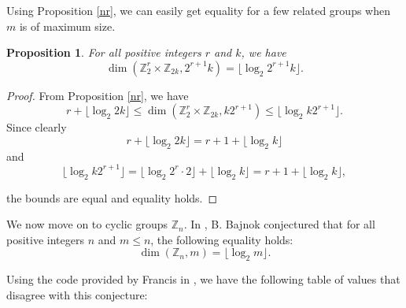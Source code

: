 \documentclass[11pt]{article}
\newcommand{\Z}{\mathbb{Z}}
\newtheorem{prop}[thm]{Proposition}
\begin{document}
\newpage
Using Proposition \ref{nr}, we can easily get equality for a few related groups when $m$ is of maximum size.



\begin{prop}
For all positive integers $r$ and $k$, we have
\[\dim(\Z_2^r\times\Z_{2k},2^{r+1}k)=\lfloor\log_2 2^{r+1}k\rfloor.\]
\end{prop}
\begin{proof}
    From Proposition \ref{nr}, we have
    \[r+\lfloor\log_2 2k\rfloor\leq\dim(\Z_2^r\times\Z_{2k},k2^{r+1})\leq\lfloor\log_2 k2^{r+1}\rfloor.\]
    Since clearly
    \[r+\lfloor\log_2 2k\rfloor=r+1+\lfloor\log_2 k\rfloor\]
    and
    \[\lfloor\log_2 k2^{r+1}\rfloor=\lfloor\log_2 2^r\cdot 2\rfloor+\lfloor\log_2 k\rfloor=r+1+\lfloor\log_2 k\rfloor,\]
    
    \noindent the bounds are equal and equality holds.
\end{proof}


We now move on to cyclic groups $\Z_n$. In \cite{bb}, B. Bajnok conjectured that for all positive integers $n$ and $m\leq n$, the following equality holds:
\[\dim(\Z_n,m)=\lfloor \log_2 m\rfloor.\]

Using the code provided by Francis in \cite{peter}, we have the following table of values that disagree with this conjecture:
\end{document}
